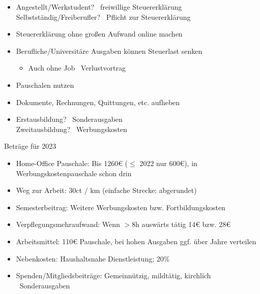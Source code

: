 \documentclass{beamer}
\begin{document}
			\begin{frame}
				\begin{itemize}
					\item Angestellt/Werkstudent? \textrightarrow\ freiwillige Steuererklärung\\
					Selbstständig/Freiberufler? \textrightarrow\ Pflicht zur Steuererklärung\pause
					\item Steuererklärung ohne großen Aufwand online machen\pause
					\item Berufliche/Universitäre Ausgaben können Steuerlast senken
					\begin{itemize}
						\item Auch ohne Job \textrightarrow\ Verlustvortrag
					\end{itemize}
					\item Pauschalen nutzen
					\item Dokumente, Rechnungen, Quittungen, etc. aufheben\pause
					\item Erstausbildung? \textrightarrow\ Sonderausgaben\\
					Zweitausbildung? \textrightarrow\ Werbungskosten\vspace{-0.1cm}
				\end{itemize}
			\end{frame}
		
			\begin{frame}{}
				{\scriptsize Beträge für 2023}
				\begin{itemize}
					\item Home-Office Pauschale: Bis 1260€ ($\leq$ 2022 nur 600€), in Werbungskostenpauschale schon drin
					\item Weg zur Arbeit: 30ct / km (einfache Strecke; abgerundet)
					\item Semesterbeitrag: Weitere Werbungskosten bzw. Fortbildungskosten
					\item Verpflegungsmehraufwand: Wenn $>$8h auswärts tätig 14€ bzw. 28€
					\item Arbeitsmittel: 110€ Pauschale, bei hohen Ausgaben ggf. über Jahre verteilen
					\item Nebenkosten: Haushaltsnahe Dienstleistung; 20\%
					\item Spenden/Mitgliedsbeiträge: Gemeinnützig, mildtätig, kirchlich \textrightarrow\ Sonderausgaben
				\end{itemize}
			\end{frame}
		
\end{document}
